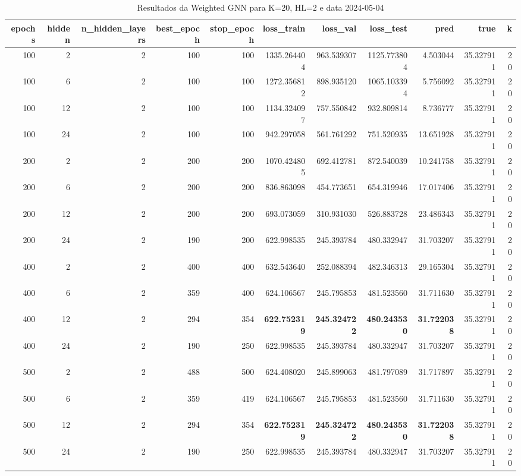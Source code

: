 \begin{table}
\caption{Resultados da Weighted GNN para K=20, HL=2 e data 2024-05-04}
\label{tab:weighted_gnn_results_k20_hl2_d20240504}
\begin{tabular}{rrrrrrrrrrr}
\toprule
epochs & hidden & n\_hidden\_layers & best\_epoch & stop\_epoch & loss\_train & loss\_val & loss\_test & pred & true & k \\
\midrule
100 & 2 & 2 & 100 & 100 & 1335.264404 & 963.539307 & 1125.773804 & 4.503044 & 35.327911 & 20 \\
100 & 6 & 2 & 100 & 100 & 1272.356812 & 898.935120 & 1065.103394 & 5.756092 & 35.327911 & 20 \\
100 & 12 & 2 & 100 & 100 & 1134.324097 & 757.550842 & 932.809814 & 8.736777 & 35.327911 & 20 \\
100 & 24 & 2 & 100 & 100 & 942.297058 & 561.761292 & 751.520935 & 13.651928 & 35.327911 & 20 \\
200 & 2 & 2 & 200 & 200 & 1070.424805 & 692.412781 & 872.540039 & 10.241758 & 35.327911 & 20 \\
200 & 6 & 2 & 200 & 200 & 836.863098 & 454.773651 & 654.319946 & 17.017406 & 35.327911 & 20 \\
200 & 12 & 2 & 200 & 200 & 693.073059 & 310.931030 & 526.883728 & 23.486343 & 35.327911 & 20 \\
200 & 24 & 2 & 190 & 200 & 622.998535 & 245.393784 & 480.332947 & 31.703207 & 35.327911 & 20 \\
400 & 2 & 2 & 400 & 400 & 632.543640 & 252.088394 & 482.346313 & 29.165304 & 35.327911 & 20 \\
400 & 6 & 2 & 359 & 400 & 624.106567 & 245.795853 & 481.523560 & 31.711630 & 35.327911 & 20 \\
400 & 12 & 2 & 294 & 354 & \textbf{622.752319} & \textbf{245.324722} & \textbf{480.243530} & \textbf{31.722038} & 35.327911 & 20 \\
400 & 24 & 2 & 190 & 250 & 622.998535 & 245.393784 & 480.332947 & 31.703207 & 35.327911 & 20 \\
500 & 2 & 2 & 488 & 500 & 624.408020 & 245.899063 & 481.797089 & 31.717897 & 35.327911 & 20 \\
500 & 6 & 2 & 359 & 419 & 624.106567 & 245.795853 & 481.523560 & 31.711630 & 35.327911 & 20 \\
500 & 12 & 2 & 294 & 354 & \textbf{622.752319} & \textbf{245.324722} & \textbf{480.243530} & \textbf{31.722038} & 35.327911 & 20 \\
500 & 24 & 2 & 190 & 250 & 622.998535 & 245.393784 & 480.332947 & 31.703207 & 35.327911 & 20 \\

\end{tabular}
\end{table}
